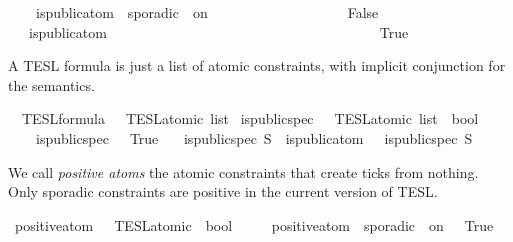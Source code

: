 \begin{isabellebody}
\ \ \ \ {\isacartoucheopen}is{\isacharunderscore}public{\isacharunderscore}atom\ {\isacharparenleft}{\isacharunderscore}\ sporadic{\isasymsharp}\ {\isacharunderscore}\ on\ {\isacharunderscore}{\isacharparenright}\ \ \ \ \ \ \ \ \ \ \ \ \ \ \ \ \ \ {\isacharequal}\ False{\isacartoucheclose}\isanewline
\ \ {\isacharbar}\ {\isacartoucheopen}is{\isacharunderscore}public{\isacharunderscore}atom\ {\isacharunderscore}\ \ \ \ \ \ \ \ \ \ \ \ \ \ \ \ \ \ \ \ \ \ \ \ \ \ \ \ \ \ \ \ \ \ \ \ \ {\isacharequal}\ True{\isacartoucheclose}%
\begin{isamarkuptext}%
A TESL formula is just a list of atomic constraints, with implicit conjunction
  for the semantics.%
\end{isamarkuptext}\isamarkuptrue%
\isamarkupfalse%
\ {\isacharprime}{\isasymtau}\ TESL{\isacharunderscore}formula\ {\isacharequal}\ {\isacartoucheopen}{\isacharprime}{\isasymtau}\ TESL{\isacharunderscore}atomic\ list{\isacartoucheclose}\isanewline
\isanewline
{}\isamarkupfalse%
\ is{\isacharunderscore}public{\isacharunderscore}spec\ {\isacharcolon}{\isacharcolon}\ {\isacartoucheopen}{\isacharprime}{\isasymtau}\ TESL{\isacharunderscore}atomic\ list\ {\isasymRightarrow}\ bool{\isacartoucheclose}\ \isanewline
\ \ \ \ {\isacartoucheopen}is{\isacharunderscore}public{\isacharunderscore}spec\ {\isacharbrackleft}{\isacharbrackright}\ {\isacharequal}\ True{\isacartoucheclose}\isanewline
\ \ {\isacharbar}\ {\isacartoucheopen}is{\isacharunderscore}public{\isacharunderscore}spec\ {\isacharparenleft}{\isasymphi}{\isacharhash}S{\isacharparenright}\ {\isacharequal}\ {\isacharparenleft}{\isacharparenleft}is{\isacharunderscore}public{\isacharunderscore}atom\ {\isasymphi}{\isacharparenright}\ {\isasymand}\ {\isacharparenleft}is{\isacharunderscore}public{\isacharunderscore}spec\ S{\isacharparenright}{\isacharparenright}{\isacartoucheclose}%
\begin{isamarkuptext}%
We call \emph{positive atoms} the atomic constraints that create ticks from nothing.
  Only sporadic constraints are positive in the current version of TESL.%
\end{isamarkuptext}\isamarkuptrue%
\isamarkupfalse%
\ positive{\isacharunderscore}atom\ {\isacharcolon}{\isacharcolon}\ {\isacartoucheopen}{\isacharprime}{\isasymtau}\ TESL{\isacharunderscore}atomic\ {\isasymRightarrow}\ bool{\isacartoucheclose}\ \isanewline
\ \ \ \ {\isacartoucheopen}positive{\isacharunderscore}atom\ {\isacharparenleft}{\isacharunderscore}\ sporadic\ {\isacharunderscore}\ on\ {\isacharunderscore}{\isacharparenright}\ {\isacharequal}\ True{\isacartoucheclose}\isanewline

\end{isabellebody}
